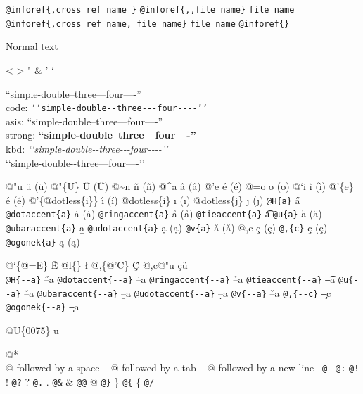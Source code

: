 \documentclass{book}
\newcommand\Texinfocommandstyletextkbd[1]{{\ttfamily\textsl{#1}}}%
\renewcommand{\_}{\Texinfounderscore\discretionary{}{}{}}
\begin{document}
\texttt{@inforef\{,cross ref name \}} 
\texttt{@inforef\{{,}{,}file name\}} \texttt{file name}
\texttt{@inforef\{,cross ref name,\ file name\}} \texttt{file name}
\texttt{@inforef\{\}} 



Normal text

<
>
"
\&
'
`

``simple-double--three---four----''\leavevmode{}\\
code: \texttt{{`}{`}simple-double{-}{-}three{-}{-}{-}four{-}{-}{-}-{'}{'}} \leavevmode{}\\
asis: ``simple-double--three---four----'' \leavevmode{}\\
strong: \textbf{``simple-double--three---four----''} \leavevmode{}\\
kbd: \Texinfocommandstyletextkbd{{`}{`}simple-double{-}{-}three{-}{-}{-}four{-}{-}{-}-{'}{'}} \leavevmode{}\\

`\hbox{}`simple-double-\hbox{}-three---four----'\hbox{}'\leavevmode{}\\

%
%
%
%

@"u \"{u} (ü)
@"\{U\} \"{U} (Ü) 
@\~{}n \~{n} (ñ)
@\^{}a \^{a} (â)
@'e \'{e} (é)
@=o \={o} (ō)
@`i \`{i} (ì)
@'\{e\} \'{e} (é)
@'\{@dotless\{i\}\} \'{\i{}} (í)
@dotless\{i\} \i{} (ı)
@dotless\{j\} \j{} (ȷ)
\texttt{@H\{a\}} \H{a}
\texttt{@dotaccent\{a\}} \.{a} (ȧ)
\texttt{@ringaccent\{a\}} \r{a} (å)
\texttt{@tieaccent\{a\}} \t{a}
\texttt{@u\{a\}} \u{a} (ă)
\texttt{@ubaraccent\{a\}} \b{a}
\texttt{@udotaccent\{a\}} \d{a} (ạ)
\texttt{@v\{a\}} \v{a} (ǎ)
@,c \c{c} (ç)
\texttt{@,\{c\}} \c{c} (ç)
\texttt{@ogonek\{a\}} \k{a} (ą)

@`\{@=E\} \`{\={E}}
@l\{\} \l{}
@,\{@'C\} \c{\'{C}}
@,c@"u \c{c}\"{u} \leavevmode{}\\

\texttt{@H\{{-}{-}a\}} \H{--a}
\texttt{@dotaccent\{{-}{-}a\}} \.{--a}
\texttt{@ringaccent\{{-}{-}a\}} \r{--a}
\texttt{@tieaccent\{{-}{-}a\}} \t{--a}
\texttt{@u\{{-}{-}a\}} \u{--a}
\texttt{@ubaraccent\{{-}{-}a\}} \b{--a}
\texttt{@udotaccent\{{-}{-}a\}} \d{--a}
\texttt{@v\{{-}{-}a\}} \v{--a}
\texttt{@,\{{-}{-}c\}} \c{--c}
\texttt{@ogonek\{{-}{-}a\}} \k{--a}

@U\{0075\} u

@* \leavevmode{}\\
@ followed by a space
\ {}
@ followed by a tab
\ {}
@ followed by a new line
\ {}\texttt{@-} \-{}
\texttt{@:} \@
\texttt{@!} \@!
\texttt{@?} \@?
\texttt{@.} \@.
\texttt{@\&} \&
\texttt{@@} @
\texttt{@\}} \}
\texttt{@\{} \{
\texttt{@/} 
\end{document}
